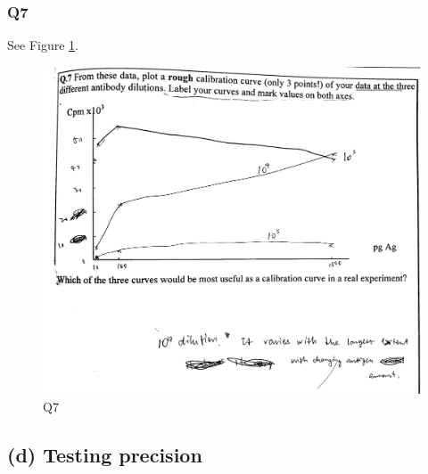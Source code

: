 \documentclass[
]{article}
\begin{document}
\hypertarget{q7}{%
\subsubsection*{Q7}\label{q7}}

See Figure \ref{fig:immunolab-q7}.

\begin{figure}
\includegraphics[width=1\linewidth]{../img/immunolab-q7} \caption{Q7}\label{fig:immunolab-q7}
\end{figure}

\hypertarget{d-testing-precision}{%
\subsection*{(d) Testing precision}\label{d-testing-precision}}
\end{document}
